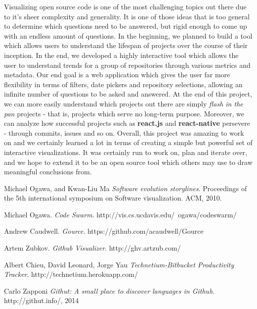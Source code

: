 \documentclass{article}
\begin{document}
Visualizing open source code is one of the most challenging topics out there due to it's sheer complexity and generality. It is one of those ideas that is too general to determine which questions need to be answered, but rigid enough to come up with an endless amount of questions. In the beginning, we planned to build a tool which allows users to understand the lifespan of projects over the course of their inception. In the end, we developed a highly interactive tool which allows the user to understand trends for a group of repositories through various metrics and metadata. Our end goal is a web application which gives the user far more flexibility in terms of filters, date pickers and repository selections, allowing an infinite number of questions to be asked and answered. At the end of this project, we can more easily understand which projects out there are simply \emph{flash in the pan} projects - that is, projects which serve no long-term purpose. Moreover, we can analyze how successful projects such as \textbf{react.js} and \textbf{react-native} persevere - through commits, issues and so on. Overall, this project was amazing to work on and we certainly learned a lot in terms of creating a simple but powerful set of interactive visualizations. It was certainly run to work on, plan and iterate over, and we hope to extend it to be an open source tool which others may use to draw meaningful conclusions from.

\newpage

\begin{thebibliography}{9}
 
Michael Ogawa, and Kwan-Liu Ma
\textit{Software evolution storylines}.
Proceedings of the 5th international symposium on Software visualization. ACM, 2010.

Michael Ogawa.
\textit{Code Swarm}.
http://vis.cs.ucdavis.edu/~ogawa/codeswarm/

Andrew Caudwell.
\textit{Gource}.
https://github.com/acaudwell/Gource

Artem  Zubkov.
\textit{Github Visualizer}.
http://ghv.artzub.com/

Albert Chieu, David Leonard, Jorge Yau
\textit{Technetium-Bitbucket Productivity Tracker}.
http://technetium.herokuapp.com/

Carlo Zapponi
\textit{Githut: A small place to discover languages in Github}.
http://githut.info/, 2014

\end{thebibliography}
\end{document}
